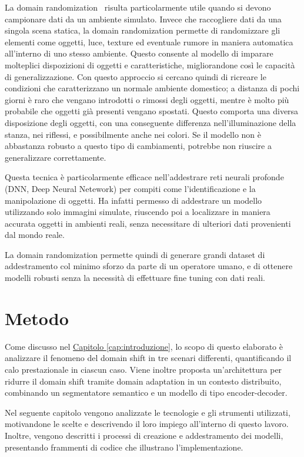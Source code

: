 \documentclass[12pt]{report}
\begin{document}
La domain randomization~\cite{8202133} risulta particolarmente utile quando si devono campionare dati da un ambiente simulato. Invece che raccogliere dati da una singola scena statica, la domain randomization permette di randomizzare gli elementi come oggetti, luce, texture ed eventuale rumore in maniera automatica all'interno di uno stesso ambiente. Questo consente al modello di imparare molteplici dispozizioni di oggetti e caratteristiche, migliorandone così le capacità di generalizzazione. Con questo approccio si cercano quindi di ricreare le condizioni che caratterizzano un normale ambiente domestico; a distanza di pochi giorni è raro che vengano introdotti o rimossi degli oggetti, mentre è molto più probabile che oggetti già presenti vengano spostati. Questo comporta una diversa disposizione degli oggetti, con una conseguente differenza nell'illuminazione della stanza, nei riflessi, e possibilmente anche nei colori. Se il modello non è abbastanza robusto a questo tipo di cambiamenti, potrebbe non riuscire a generalizzare correttamente.

Questa tecnica è particolarmente efficace nell'addestrare reti neurali profonde (DNN, Deep Neural Netework) per compiti come l'identificazione e la manipolazione di oggetti. Ha infatti permesso di addestrare un modello utilizzando solo immagini simulate, riuscendo poi a localizzare in maniera accurata oggetti in ambienti reali, senza necessitare di ulteriori dati provenienti dal mondo reale.

La domain randomization permette quindi di generare grandi dataset di addestramento col minimo sforzo da parte di un operatore umano, e di ottenere modelli robusti senza la necessità di effettuare fine tuning con dati reali.

\chapter{Metodo}
\label{chap:metodo}

Come discusso nel \hyperref[cap:introduzione]{Capitolo \ref{cap:introduzione}}, lo scopo di questo elaborato è analizzare il fenomeno del domain shift in tre scenari differenti, quantificando il calo prestazionale in ciascun caso. Viene inoltre proposta un'architettura per ridurre il domain shift tramite domain adaptation in un contesto distribuito, combinando un segmentatore semantico e un modello di tipo encoder-decoder.

Nel seguente capitolo vengono analizzate le tecnologie e gli strumenti utilizzati, motivandone le scelte e descrivendo il loro impiego all'interno di questo lavoro. Inoltre, vengono descritti i processi di creazione e addestramento dei modelli, presentando frammenti di codice che illustrano l'implementazione.
\end{document}
